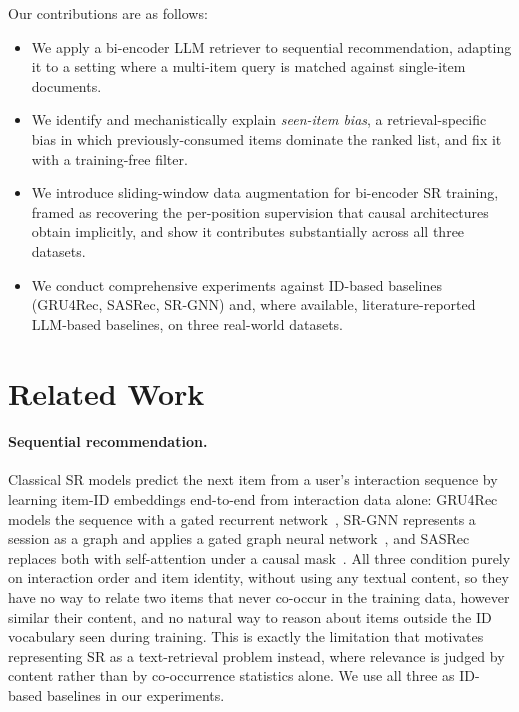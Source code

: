 \documentclass[runningheads]{llncs}
\begin{document}
Our contributions are as follows:

\begin{itemize}
\item We apply a bi-encoder LLM retriever to sequential recommendation, adapting it to a setting where a multi-item query is matched against single-item documents.
\item We identify and mechanistically explain \emph{seen-item bias}, a retrieval-specific bias in which previously-consumed items dominate the ranked list, and fix it with a training-free filter.
\item We introduce sliding-window data augmentation for bi-encoder SR training, framed as recovering the per-position supervision that causal architectures obtain implicitly, and show it contributes substantially across all three datasets.
\item We conduct comprehensive experiments against ID-based baselines (GRU4Rec, SASRec, SR-GNN) and, where available, literature-reported LLM-based baselines, on three real-world datasets.
\end{itemize}

\section{Related Work}
\label{sec:relwork}

\paragraph{Sequential recommendation.}
Classical SR models predict the next item from a user's interaction sequence by learning item-ID embeddings end-to-end from interaction data alone: GRU4Rec models the sequence with a gated recurrent network~\cite{hidasi2016}, SR-GNN represents a session as a graph and applies a gated graph neural network~\cite{wu2019}, and SASRec replaces both with self-attention under a causal mask~\cite{kang2018}. All three condition purely on interaction order and item identity, without using any textual content, so they have no way to relate two items that never co-occur in the training data, however similar their content, and no natural way to reason about items outside the ID vocabulary seen during training. This is exactly the limitation that motivates representing SR as a text-retrieval problem instead, where relevance is judged by content rather than by co-occurrence statistics alone. We use all three as ID-based baselines in our experiments.
\end{document}
